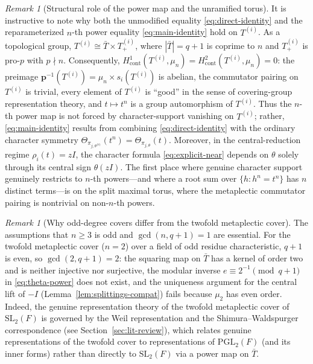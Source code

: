 \documentclass[12pt, letterpaper]{article}
\numberwithin{equation}{section}
\theoremstyle{definition}
\theoremstyle{remark}
\newtheorem{remark}[theorem]{Remark}
\newcommand{\G}{\mathrm{SL}_2(F)}
\begin{document}
\begin{remark}[Structural role of the power map and the unramified torus]\label{rem:structural-power}
It is instructive to note why both the unmodified equality \eqref{eq:direct-identity} and the reparameterized $n$-th power equality \eqref{eq:main-identity} hold on $T^{(i)}$. As a topological group, $T^{(i)}\cong\bar{T}\times T^{(i)}_+$, where $|\bar{T}|=q+1$ is coprime to $n$ and $T^{(i)}_+$ is pro-$p$ with $p\nmid n$. Consequently, $H^1_{\mathrm{cont}}(T^{(i)},\mu_n)=H^2_{\mathrm{cont}}(T^{(i)},\mu_n)=0$: the preimage $\mathbf{p}^{-1}(T^{(i)})=\mu_n\times s_i(T^{(i)})$ is abelian, the commutator pairing on $T^{(i)}$ is trivial, every element of $T^{(i)}$ is ``good'' in the sense of covering-group representation theory, and $t\mapsto t^n$ is a group automorphism of $T^{(i)}$. Thus the $n$-th power map is not forced by character-support vanishing on $T^{(i)}$; rather, \eqref{eq:main-identity} results from combining \eqref{eq:direct-identity} with the ordinary character symmetry $\Theta_{\pi_{j,\theta^{\langle n\rangle}}}(t^n)=\Theta_{\pi_{j,\theta}}(t)$. Moreover, in the central-reduction regime $\rho_i(t)=zI$, the character formula \eqref{eq:explicit-near} depends on $\theta$ solely through its central sign $\theta(zI)$. The first place where genuine character support genuinely restricts to $n$-th powers---and where a root sum over $\{h:h^n=t^n\}$ has $n$ distinct terms---is on the split maximal torus, where the metaplectic commutator pairing is nontrivial on non-$n$-th powers.
\end{remark}

\begin{remark}[Why odd-degree covers differ from the twofold metaplectic cover]\label{rem:odd-vs-even}
The assumptions that $n\ge 3$ is odd and $\gcd(n,q+1)=1$ are essential. For the twofold metaplectic cover ($n=2$) over a field of odd residue characteristic, $q+1$ is even, so $\gcd(2,q+1)=2$: the squaring map on $\bar{T}$ has a kernel of order two and is neither injective nor surjective, the modular inverse $e\equiv 2^{-1}\pmod{q+1}$ in \eqref{eq:theta-power} does not exist, and the uniqueness argument for the central lift of $-I$ (Lemma~\ref{lem:splittings-compat}) fails because $\mu_2$ has even order. Indeed, the genuine representation theory of the twofold metaplectic cover of $\G$ is governed by the Weil representation and the Shimura--Waldspurger correspondence (see Section~\ref{sec:lit-review}), which relates genuine representations of the twofold cover to representations of $\mathrm{PGL}_2(F)$ (and its inner forms) rather than directly to $\G$ via a power map on $\bar{T}$.
\end{remark}
\end{document}

